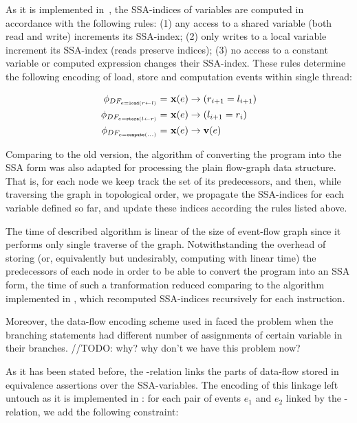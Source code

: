 As it is implemented in~\cite{Porthos17}, the SSA-indices of variables are computed in accordance with the following rules: (1) any access to a shared variable (both read and write) increments its SSA-index; (2) only writes to a local variable increment its SSA-index (reads preserve indices); (3) no access to a constant variable or computed expression changes their SSA-index.
These rules determine the following encoding of load, store and computation events within single thread:

\begin{align}
\phi_{DF_{e = \mathtt{load}(r \leftarrow l)}} = \ & \fx(e) \rightarrow (r_{i+1} = l_{i+1}) \\
\phi_{DF_{e = \mathtt{store}(l \leftarrow r)}} = \ & \fx(e) \rightarrow (l_{i+1} = r_i) \\
\phi_{DF_{e = \mathtt{compute}(...)}} = \ & \fx(e) \rightarrow \fv(e) %
\end{align}

Comparing to the old \Porthos version, the algorithm of converting the program into the SSA form was also adapted for processing the plain flow-graph data structure. That is, for each node we keep track the set of its predecessors, and then, while traversing the graph in topological order, we propagate the SSA-indices for each variable defined so far, and update these indices according the rules listed above. 

The time of described algorithm is linear of the size of event-flow graph since it performs only single traverse of the graph. Notwithstanding the overhead of storing (or, equivalently but undesirably, computing with%
linear time) the predecessors of each node in order to be able to convert the program into an SSA form, the time of such a tranformation reduced%
comparing to the algorithm implemented in \Porthos, which recomputed SSA-indices recursively for each instruction.%

Moreover, the data-flow encoding scheme used in \Porthos faced the problem when the branching statements had different number of assignments of certain variable in their branches. //TODO: why? why don't we have this problem now? 

As it has been stated before, the \rf-relation links the parts%
of data-flow stored in equivalence assertions over the SSA-variables. 
The encoding of this linkage left untouch as it is implemented in \Porthos: for each pair of events $e_1$ and $e_2$ linked by the \rf-relation, we add the following constraint:


